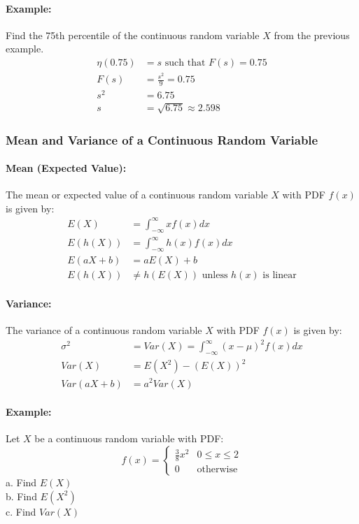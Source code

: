 \paragraph*{Example:}
Find the 75th percentile of the continuous random variable $X$ from the previous example.
\begin{align*}
    \eta (0.75) &= s \text{ such that } F(s) = 0.75 \\
    F(s) &= \frac{s^2}{9} = 0.75 \\
    s^2 &= 6.75 \\
    s &= \sqrt{6.75} \approx 2.598
\end{align*}

\hrulefill

\subsubsection{Mean and Variance of a Continuous Random Variable}
\paragraph{Mean (Expected Value):} The mean or expected value of a continuous random variable $X$ with PDF $f(x)$ is given by:
\begin{align*}
    E(X) &= \int_{-\infty}^{\infty} x f(x) dx\\
    E(h(X)) &= \int_{-\infty}^{\infty} h(x) f(x) dx\\
    E(aX+b) &= aE(X) + b\\
    E(h(X)) &\neq h(E(X)) \text{ unless $h(x)$ is linear}
\end{align*}


\paragraph{Variance:} The variance of a continuous random variable $X$ with PDF $f(x)$ is given by:
\begin{align*}
    \sigma^2 &= Var(X) = \int_{-\infty}^{\infty} (x - \mu)^2 f(x) dx \\
    Var(X) &= E(X^2) - (E(X))^2\\
    Var(aX+b) &= a^2 Var(X)
\end{align*}

\pagebreak

\paragraph*{Example:}
Let $X$ be a continuous random variable with PDF:
\[
    f(x) = \begin{cases}
        \frac{3}{8} x^2 & 0 \leq x \leq 2 \\
        0 & \text{otherwise}
    \end{cases}
\]
a. Find $E(X)$\\
b. Find $E(X^2)$\\
c. Find $Var(X)$\\

